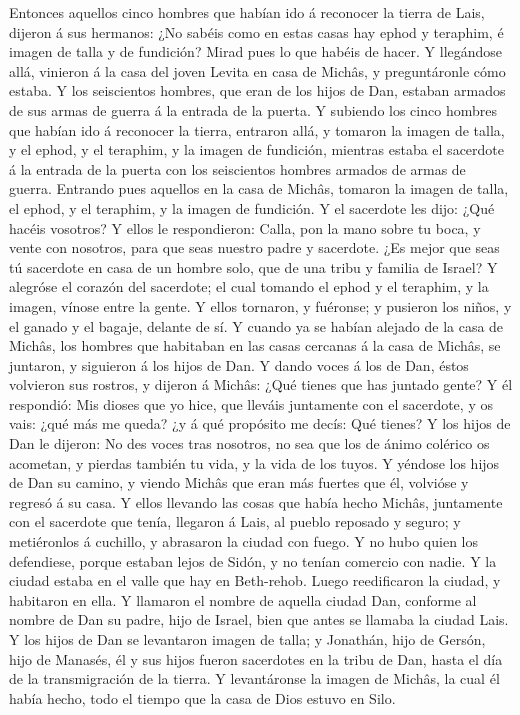 Entonces aquellos cinco hombres que habían ido á reconocer la tierra de
Lais, dijeron á sus hermanos: ¿No sabéis como en estas casas hay ephod y
teraphim, é imagen de talla y de fundición? Mirad pues lo que habéis de
hacer.  Y llegándose allá, vinieron á la casa del joven
Levita en casa de Michâs, y preguntáronle cómo estaba.  Y
los seiscientos hombres, que eran de los hijos de Dan, estaban armados
de sus armas de guerra á la entrada de la puerta.  Y
subiendo los cinco hombres que habían ido á reconocer la tierra,
entraron allá, y tomaron la imagen de talla, y el ephod, y el teraphim,
y la imagen de fundición, mientras estaba el sacerdote á la entrada de
la puerta con los seiscientos hombres armados de armas de guerra.
 Entrando pues aquellos en la casa de Michâs, tomaron la
imagen de talla, el ephod, y el teraphim, y la imagen de fundición. Y el
sacerdote les dijo: ¿Qué hacéis vosotros?  Y ellos le
respondieron: Calla, pon la mano sobre tu boca, y vente con nosotros,
para que seas nuestro padre y sacerdote. ¿Es mejor que seas tú sacerdote
en casa de un hombre solo, que de una tribu y familia de Israel?
 Y alegróse el corazón del sacerdote; el cual tomando el
ephod y el teraphim, y la imagen, vínose entre la gente. 
Y ellos tornaron, y fuéronse; y pusieron los niños, y el ganado y el
bagaje, delante de sí.  Y cuando ya se habían alejado de
la casa de Michâs, los hombres que habitaban en las casas cercanas á la
casa de Michâs, se juntaron, y siguieron á los hijos de Dan.
 Y dando voces á los de Dan, éstos volvieron sus rostros,
y dijeron á Michâs: ¿Qué tienes que has juntado gente?  Y
él respondió: Mis dioses que yo hice, que lleváis juntamente con el
sacerdote, y os vais: ¿qué más me queda? ¿y á qué propósito me decís:
Qué tienes?  Y los hijos de Dan le dijeron: No des voces
tras nosotros, no sea que los de ánimo colérico os acometan, y pierdas
también tu vida, y la vida de los tuyos.  Y yéndose los
hijos de Dan su camino, y viendo Michâs que eran más fuertes que él,
volvióse y regresó á su casa.  Y ellos llevando las cosas
que había hecho Michâs, juntamente con el sacerdote que tenía, llegaron
á Lais, al pueblo reposado y seguro; y metiéronlos á cuchillo, y
abrasaron la ciudad con fuego.  Y no hubo quien los
defendiese, porque estaban lejos de Sidón, y no tenían comercio con
nadie. Y la ciudad estaba en el valle que hay en Beth-rehob. Luego
reedificaron la ciudad, y habitaron en ella.  Y llamaron
el nombre de aquella ciudad Dan, conforme al nombre de Dan su padre,
hijo de Israel, bien que antes se llamaba la ciudad Lais.
 Y los hijos de Dan se levantaron imagen de talla; y
Jonathán, hijo de Gersón, hijo de Manasés, él y sus hijos fueron
sacerdotes en la tribu de Dan, hasta el día de la transmigración de la
tierra.  Y levantáronse la imagen de Michâs, la cual él
había hecho, todo el tiempo que la casa de Dios estuvo en Silo.

